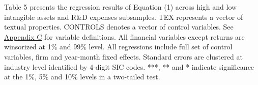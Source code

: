 \begin{table}[H]
\begin{footnotesize}
			\noindent Table 5 presents the regression results of Equation (1) across high and low intangible assets and R\&D expenses subsamples. TEX represents a vector of textual properties. CONTROLS denotes a vector of control variables. See \hyperref[appc]{Appendix C} for variable definitions. All financial variables except returns are winsorized at 1\% and 99\% level. All regressions include full set of control variables, firm and year-month fixed effects. Standard errors are clustered at industry level identified by 4-digit SIC codes. ***, ** and * indicate significance at the 1\%, 5\% and 10\% levels in a two-tailed test.
		\end{footnotesize}
\end{table}%